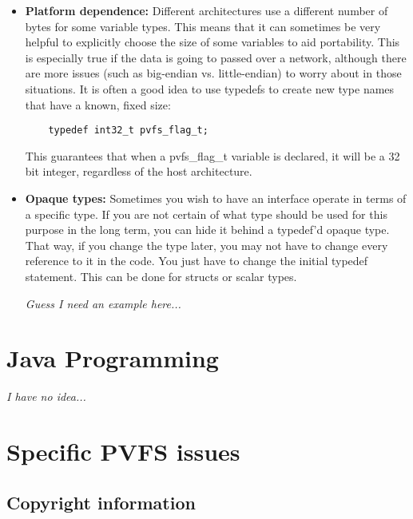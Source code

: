 \documentclass[11pt, letterpaper]{article}
\begin{document}
\begin{itemize}
	\item \textbf{Platform dependence:} Different architectures use a
	different number of bytes for some variable types.  This means that
	it can sometimes be very helpful to explicitly choose the size of
	some variables to aid portability.  This is especially true if the
	data is going to passed over a network, although there are more
	issues (such as big-endian vs. little-endian) to worry about in those 
	situations.  It is often a good idea to use typedefs to create new
	type names that have a known, fixed size:

	\begin{verbatim}
	typedef int32_t pvfs_flag_t;
	\end{verbatim}

	This guarantees that when a pvfs\_flag\_t variable is declared, it
	will be a 32 bit integer, regardless of the host architecture.

	\item \textbf{Opaque types:} Sometimes you wish to have an
	interface operate in terms of a specific type.  If you are not
	certain of what type should be used for this purpose in the long term, you can hide it behind a
	typedef'd opaque type.  That way, if you change the type later, you
	may not have to change every reference to it in the code.  You just
	have to change the initial typedef statement.  This can be done for 
	structs or scalar types.

	\emph{Guess I need an example here...}

\end{itemize}




\section{Java Programming}

\emph{I have no idea...}



\section{Specific PVFS issues}

\subsection{Copyright information}
\label{sec:pvfs-copyright}
\end{document}
